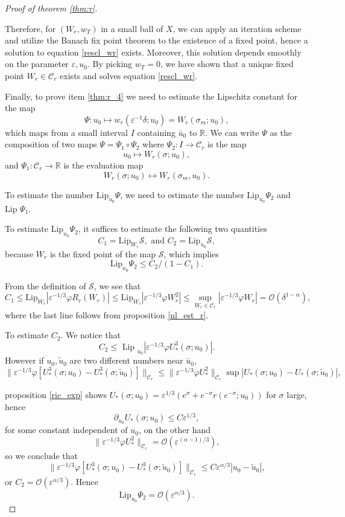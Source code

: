 \documentclass[letterpaper,11pt]{article}
\newcommand{\rmO}{\mathcal{O}}
\newcommand{\eps}{\varepsilon}
\numberwithin{equation}{section}
\theoremstyle{plain}
\begin{document}
\begin{proof}[Proof of theorem \ref{thm:r}]
\begin{itemize}
\end{itemize}

Therefore, for $(W_r,w_T)$ in a small ball of $X$, we can apply an iteration scheme and utilize the Banach fix point theorem to the existence of a fixed point, hence a solution to equation \eqref{rescl_wr} exists. Moreover, this solution depends smoothly on the parameter $\eps, u_0$. By picking $w_T = 0$, we have shown that a unique fixed point $W_r \in \mathcal{C}_r$ exists and solves equation \eqref{rescl_wr}.


Finally, to prove item \ref{thm:r_4} we need to estimate the Lipschitz constant for the map 
\[
\Psi : u_0 \mapsto w_r(\eps^{-1}\delta; u_0)=W_r(\sigma_m;u_0),
\]
 which maps from a small interval $I$ containing $\bar{u}_0$ to $\mathbb{R}$. We can write $\Psi$ as the composition of two maps $\Psi = \Psi_1 \circ \Psi_2$ where $\Psi_2 : I \to \mathcal{C}_r$ is the map 
\[
 u_0 \mapsto W_r(\sigma; u_0),
\] 
and $\Psi_1 : \mathcal{C}_r \to \mathbb{R}$ is the evaluation map
\[
  W_r(\sigma; u_0) \mapsto W_r(\sigma_m, u_0).
\]
 
To estimate the number $\text{Lip}_{u_0} \Psi$, we need to estimate the number $\text{Lip}_{u_0} \Psi_2$ and $\text{Lip } \Psi_1$.

To estimate $\text{Lip}_{u_0} \Psi_2$, it suffices to estimate the following two quantities
\[
C_1 = \text{Lip}_{W_r} \mathcal{S}, \text{ and }C_2 = \text{Lip}_{u_0} \mathcal{S},
\]
because $W_r$ is the fixed point of the map $\mathcal{S}$, which implies
\[
\text{Lip}_{u_0} \Psi_2 \le  C_2/(1-C_1).
\]

From the definition of $\mathcal{S}$, we see that
\[
C_1 \le \text{Lip}_{W_r} |\eps^{-1/3}\varphi R_r(W_r)|\le \text{Lip}_{W_r} |\eps^{-1/3}\varphi W_r^2| \le\sup_{W_r \in \mathcal{C}_r} |\eps^{-1/3}\varphi W_r | = \rmO(\delta^{1-\alpha}),
\]
where the last line follows from proposition \ref{nl_est_r}.


To estimate $C_2$. We notice that 
\[
C_2 \le \text{ Lip }_{u_0} |\eps^{-1/3}\varphi U_*^3(\sigma;u_0) |.
\]
However if $u_0, \tilde{u}_0$ are two different numbers near $\bar{u}_0$,
\[
\|\eps^{-1/3}\varphi [U_*^3(\sigma;u_0)-U_*^3(\sigma;\tilde{u}_0)] \|_{\mathcal{C}_r} \le \|\eps^{-1/3}\varphi U_*^2 \|_{\mathcal{C}_r} \sup|U_*(\sigma;u_0)-U_*(\sigma;\tilde{u}_0)|,
\] 

proposition \ref{ric_exp} shows
$U_*(\sigma;u_0)= \eps^{1/3}(e^\sigma + e^{-\sigma} r(e^{-\sigma}; u_0))$ for $\sigma$ large, hence 
\[
\partial_{u_0} U_*(\sigma;u_0) \le C\eps^{1/3},
\]
for some constant independent of $u_0$, on the other hand
\[
\|\eps^{-1/3}\varphi U_*^2 \|_{\mathcal{C}_r}  = \rmO(\eps^{(\alpha-1)/3}),
\]
so we conclude that
\[
\|\eps^{-1/3}\varphi [U_*^3(\sigma;u_0)-U_*^3(\sigma;\tilde{u}_0)] \|_{\mathcal{C}_r} \le C\eps^{\alpha/3}|u_0 - \tilde{u}_0|,
\]
or $C_2 = \rmO(\eps^{\alpha/3})$. Hence 
\[
\text{Lip}_{u_0} \Psi_2 = \rmO(\eps^{\alpha/3}).
\]


\end{proof}
\end{document}
